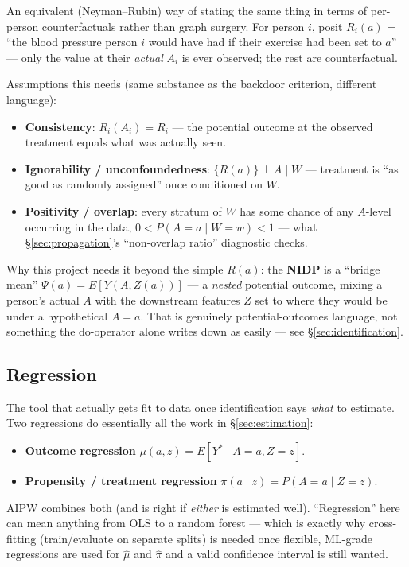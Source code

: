An equivalent (Neyman--Rubin) way of stating the same thing in terms of
per-person counterfactuals rather than graph surgery. For person $i$, posit
$R_i(a)$ = ``the blood pressure person $i$ would have had if their exercise
had been set to $a$'' --- only the value at their \emph{actual} $A_i$ is ever
observed; the rest are counterfactual.

Assumptions this needs (same substance as the backdoor criterion, different
language):
\begin{itemize}
  \item \textbf{Consistency}: $R_i(A_i) = R_i$ --- the potential outcome at
    the observed treatment equals what was actually seen.
  \item \textbf{Ignorability / unconfoundedness}: $\{R(a)\} \perp A \mid W$
    --- treatment is ``as good as randomly assigned'' once conditioned on
    $W$.
  \item \textbf{Positivity / overlap}: every stratum of $W$ has some chance
    of any $A$-level occurring in the data, $0 < P(A=a\mid W=w) < 1$ --- what
    \S\ref{sec:propagation}'s ``non-overlap ratio'' diagnostic checks.
\end{itemize}

Why this project needs it beyond the simple $R(a)$: the \textbf{NIDP} is a
``bridge mean'' $\Psi(a) = E[Y(A, Z(a))]$ --- a \emph{nested} potential
outcome, mixing a person's actual $A$ with the downstream features $Z$ set to
where they would be under a hypothetical $A=a$. That is genuinely
potential-outcomes language, not something the do-operator alone writes down
as easily --- see \S\ref{sec:identification}.

\subsection{Regression}

The tool that actually gets fit to data once identification says \emph{what}
to estimate. Two regressions do essentially all the work in
\S\ref{sec:estimation}:
\begin{itemize}
  \item \textbf{Outcome regression} $\mu(a,z) = E[Y^* \mid A=a, Z=z]$.
  \item \textbf{Propensity / treatment regression} $\pi(a\mid z) = P(A=a\mid Z=z)$.
\end{itemize}
AIPW combines both (and is right if \emph{either} is estimated well).
``Regression'' here can mean anything from OLS to a random forest --- which
is exactly why cross-fitting (train/evaluate on separate splits) is needed
once flexible, ML-grade regressions are used for $\hat\mu$ and $\hat\pi$ and
a valid confidence interval is still wanted.

